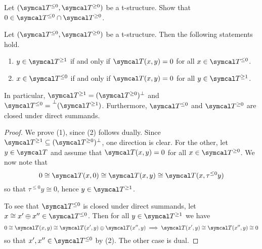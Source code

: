 \begin{exercise}\label{exercise:t-structure-zero-is-in-aisle-and-coaisle}
	Let \((\calT^{\leq 0}, \calT^{\geq 0})\) be a t-structure. Show that \(0\in\calT^{\leq 0}\cap\calT^{\geq 0}\).
\end{exercise}

\begin{corollary}\label{corollary:t-structure-orthogonality}
	Let \((\calT^{\leq 0},\calT^{\geq 0})\) be a t-structure. Then the following statements hold.
	\begin{enumerate}[label=(\arabic*)]
		\item \(y\in\calT^{\geq 1}\) if and only if \(\calT(x,y) = 0\) for all \(x\in\calT^{\leq 0}\).
		\item \(x\in\calT^{\leq 0}\) if and only if \(\calT(x,y) = 0\) for all \(y\in\calT^{\geq 1}\).
	\end{enumerate}
	In particular, \(\calT^{\geq 1} = (\calT^{\geq 0})^\perp\) and \(\calT^{\leq 0} = \bperp{(\calT^{\geq 1})}\). Furthermore, \(\calT^{\leq 0}\) and \(\calT^{\geq 0}\) are
	closed under direct summands.
\end{corollary}
\begin{proof}
We prove (1), since (2) follows dually. Since \(\calT^{\geq 1}\subseteq (\calT^{\geq0})^\perp\), one direction is clear. For the other, let \(y\in\calT\) and
assume that \(\calT(x,y) = 0\) for all \(x\in \calT^{\geq 0}\). We now note that
\[ 0 \cong \calT(x,0) \cong \calT(x,y) \cong \calT(x,\tau^{\leq 0}y) \]
so that \(\tau^{\leq 0}y \cong 0\), hence \(y\in\calT^{\geq 1}\).

To see that \(\calT^{\leq 0}\) is closed under direct summands, let \(x \cong x'\oplus x'' \in \calT^{\leq 0}\). Then for all \(y\in\calT^{\geq 1}\) we have
\[ 0\cong \calT(x,y) \cong \calT(x',y)\oplus \calT(x'',y) \implies \calT(x',y) \cong \calT(x'',y)\cong 0 \]
so that \(x',x''\in\calT^{\leq 0}\) by (2). The other case is dual.
\end{proof}

